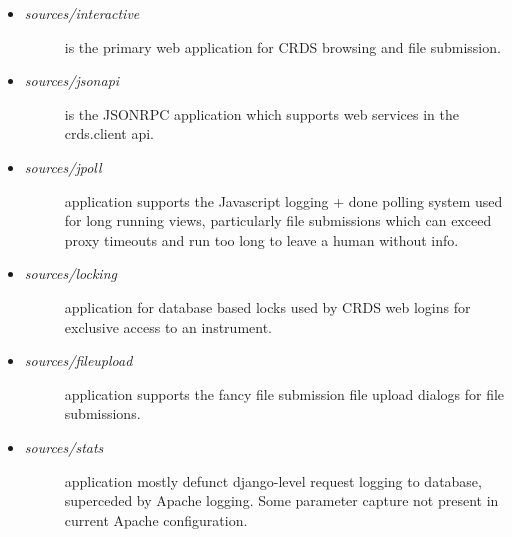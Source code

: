\documentclass[letterpaper,10pt,english]{sphinxmanual}
\begin{document}
\begin{itemize}
\begin{description}
\end{description}

\item {} \begin{description}
\item[{\emph{sources/interactive}}] \leavevmode
is the primary web application for CRDS browsing and file submission.

\end{description}

\item {} \begin{description}
\item[{\emph{sources/jsonapi}}] \leavevmode
is the JSONRPC application which supports web services in the crds.client api.

\end{description}

\item {} \begin{description}
\item[{\emph{sources/jpoll}}] \leavevmode
application supports the Javascript logging + done polling system used for long running views,
particularly file submissions which can exceed proxy timeouts and run too long to leave a human
without info.

\end{description}

\item {} \begin{description}
\item[{\emph{sources/locking}}] \leavevmode
application for database based locks used by CRDS web logins for exclusive access to an instrument.

\end{description}

\item {} \begin{description}
\item[{\emph{sources/fileupload}}] \leavevmode
application supports the fancy file submission file upload dialogs for file submissions.

\end{description}

\item {} \begin{description}
\item[{\emph{sources/stats}}] \leavevmode
application mostly defunct django-level request logging to database,  superceded by Apache
logging.  Some parameter capture not present in current Apache configuration.

\end{description}

\end{itemize}
\end{document}
